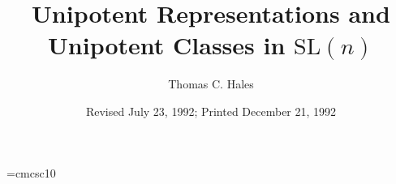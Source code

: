 \documentclass{amsart}
\begin{document}
\title{Unipotent Representations and Unipotent Classes in $\text{SL}(n)$}
\author{Thomas C. Hales}
\address{University of Chicago}
\date{Revised July 23, 1992; Printed December 21, 1992}


\parindent=8mm 
\font\smc=cmcsc10

%
%
\def\proclaim #1.{\medbreak\noindent 
  {\smc#1.\enspace}\sl} 
\def\finishproclaim {\par\rm 
  \ifdim\lastskip<\medskipamount\removelastskip 
  \penalty55\medskip\fi} 
\def\pproclaim #1:{\medbreak\noindent 
  {\bf#1.\enspace}\rm}   %
\def\finishpproclaim{\par\rm 
  \ifdim\lastskip<\medskipamount\removelastskip 
  \penalty55\medskip\fi} 
\def\vqedbox{%
    \vbox{\hrule height .4pt%
          \hbox{\vrule width .4pt%
                      \hskip .15em%
                      \vbox{\vskip .61em}%
                      \hskip .15em%
                      \vrule width .4pt%
                }
          \hrule height .4pt%
          }}
\def\qed{\hbox{}\nobreak\hfill\hbox{\vqedbox}}
%
%

\baselineskip=14pt
%




\end{document}
